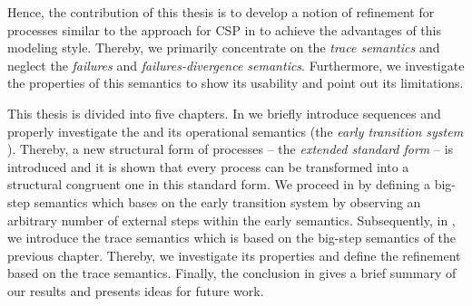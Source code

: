 Hence, the contribution of this thesis is to develop a notion of refinement for \picalc{} processes similar to the approach for \gls{CSP} in \cite{roscoe} to achieve the advantages of this modeling style. Thereby, we primarily concentrate on the \emph{trace semantics} and neglect the \emph{failures} and \emph{failures-divergence semantics}. Furthermore, we investigate the properties of this semantics to show its usability and point out its limitations.

This thesis is divided into five chapters. In  we briefly introduce sequences and properly investigate the \picalc{} and its operational semantics (the \emph{early transition system} \cite{sangiorgi}). Thereby, a new structural form of processes -- the \emph{extended standard form} -- is introduced and it is shown that every process can be transformed into a structural congruent one in this standard form. We proceed in  by defining a big-step semantics which bases on the early transition system by observing an arbitrary number of external steps within the early semantics. Subsequently, in , we introduce the trace semantics which is based on the big-step semantics of the previous chapter. Thereby, we investigate its properties and define the refinement based on the trace semantics. Finally, the conclusion in  gives a brief summary of our results and presents ideas for future work.



